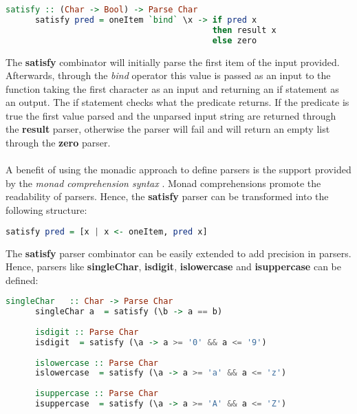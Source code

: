 \documentclass[a4paper, onecolumn]{article}
\begin{document}
    \begin{tcolorbox}
    \begin{lstlisting}[language=Haskell]
      satisfy :: (Char -> Bool) -> Parse Char
      satisfy pred = oneItem `bind` \x -> if pred x 
                                          then result x 
                                          else zero
    \end{lstlisting}
    \end{tcolorbox}
    
    \noindent The \textbf{satisfy} combinator will initially parse the first item of the input provided. Afterwards, through the \textit{bind} operator this value is passed as an input to the function taking the first character as an input and returning an if statement as an output. The if statement checks what the predicate returns. If the predicate is true the first value parsed and the unparsed input string are returned through the \textbf{result} parser, otherwise the parser will fail and will return an empty list through the \textbf{zero} parser.  \\ \\
    A benefit of using the monadic approach to define parsers is the support provided by the \textit{monad comprehension syntax} \cite{bringMonadComprehension}. Monad comprehensions promote the readability of parsers. Hence, the \textbf{satisfy} parser can be transformed into the following structure: 
    
    \begin{tcolorbox}
    \begin{lstlisting}[language=Haskell]
      satisfy pred = [x | x <- oneItem, pred x]
    \end{lstlisting}
    \end{tcolorbox}
    
    \noindent The \textbf{satisfy} parser combinator can be easily extended to add precision in parsers. Hence, parsers like \textbf{singleChar}, \textbf{isdigit}, \textbf{islowercase} and \textbf{isuppercase} can be defined:
    
    \begin{tcolorbox}
    \begin{lstlisting}[language=Haskell]
      singleChar   :: Char -> Parse Char
      singleChar a  = satisfy (\b -> a == b)
      
      isdigit :: Parse Char
      isdigit  = satisfy (\a -> a >= '0' && a <= '9')
      
      islowercase :: Parse Char
      islowercase  = satisfy (\a -> a >= 'a' && a <= 'z')
      
      isuppercase :: Parse Char 
      isuppercase  = satisfy (\a -> a >= 'A' && a <= 'Z')
    \end{lstlisting}
    \end{tcolorbox}
    
\end{document}
